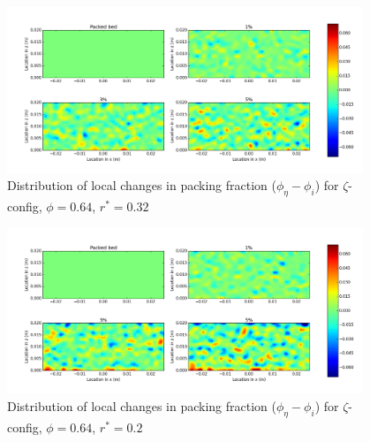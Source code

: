 \begin{figure}[!t]
    \centering
    \includegraphics[width = 0.95\textwidth]{figures/z-62-r23-1-deltas.png}
    \caption{Distribution of local changes in packing fraction ($\phi_{\eta} - \phi_i$) for $\zeta$-config, $\phi = 0.64$, $r^* = 0.32$}\label{fig:z-624-r23-deltas}
\end{figure}

\begin{figure}[!t]
    \centering
    \includegraphics[width = 0.95\textwidth]{figures/z-62-r125-1-deltas.png}
    \caption{Distribution of local changes in packing fraction ($\phi_{\eta} - \phi_i$) for $\zeta$-config, $\phi = 0.64$, $r^* = 0.2$}\label{fig:z-624-r125-deltas}
\end{figure}


\FloatBarrier


